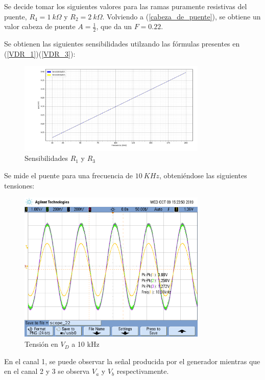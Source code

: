 Se decide tomar los siguientes valores para las ramas puramente resistivas del puente, $R_4= 1 \ k\Omega$ y $R_2= 2 \ k\Omega$. Volviendo a (\ref{cabeza_de_puente}), se obtiene un valor cabeza de puente $A=\frac{1}{2}$, que da un $F=0.22$.
\par 


Se obtienen las siguientes sensibilidades utilzando las fórmulas presentes en (\ref{VDR_1})(\ref{VDR_3}):

\begin{figure}[H]
\centering
\includegraphics[width=0.8\textwidth]{Graficos/Sensibilidad}
\caption{Sensibilidades $R_1$ y $R_3$}
\label{fig:Sensibilidades}
\end{figure}

Se mide el puente para una frecuencia de $10 \ KHz $, obteniéndose las siguientes tensiones:

\begin{figure}[H]
\centering
\includegraphics[width=0.8\textwidth,trim={0 2.2cm 0.1cm 1.75cm},clip]{Mediciones/Tensiones_10_KHz}
\caption{Tensión en $V_D$ a 10 kHz}
\label{fig:Tensiones_10_KHz}
\end{figure}
En el canal 1, se puede observar la señal producida por el generador mientras que en el canal 2 y 3 se observa $V_a$ y $V_b$ respectivamente.\par

